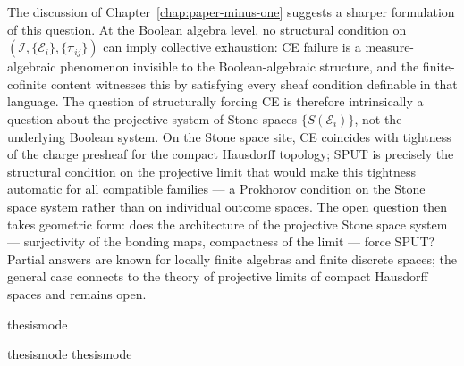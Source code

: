 The discussion of Chapter~\ref{chap:paper-minus-one} suggests a sharper
formulation of this question.  At the Boolean algebra level, no structural
condition on $(\mathcal{I}, \{\mathcal{E}_i\}, \{\pi_{ij}\})$ can imply
collective exhaustion: CE failure is a measure-algebraic phenomenon invisible
to the Boolean-algebraic structure, and the finite-cofinite content witnesses
this by satisfying every sheaf condition definable in that language.  The
question of structurally forcing CE is therefore intrinsically a question about
the projective system of Stone spaces $\{S(\mathcal{E}_i)\}$, not the underlying
Boolean system.  On the Stone space site, CE coincides with tightness of the
charge presheaf for the compact Hausdorff topology; SPUT is precisely the
structural condition on the projective limit that would make this tightness
automatic for all compatible families --- a Prokhorov condition on the Stone
space system rather than on individual outcome spaces.  The open question then
takes geometric form: does the architecture of the projective Stone space system
--- surjectivity of the bonding maps, compactness of the limit --- force SPUT?
Partial answers are known for locally finite algebras and finite discrete spaces;
the general case connects to the theory of projective limits of compact Hausdorff
spaces and remains open.


\ifcsname thesismode\endcsname\else


\fi

\ifcsname thesismode\endcsname\else
\ifcsname thesismode\endcsname\else\fi
\fi
